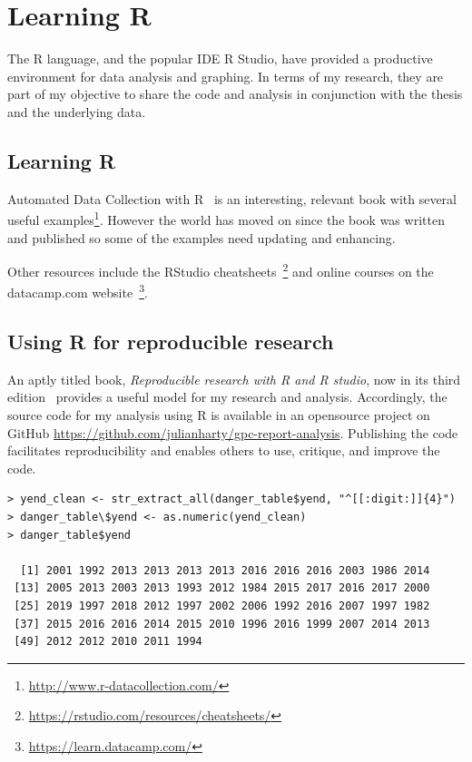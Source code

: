 \chapter{Learning R}
The R language, and the popular IDE R Studio, have provided a productive environment for data analysis and graphing. In terms of my research, they are part of my objective to share the code and analysis in conjunction with the thesis and the underlying data.

\section{Learning R}
Automated Data Collection with R~\cite{munzert2014automated} is an interesting, relevant book with several useful examples\footnote{\url{http://www.r-datacollection.com/}}. However the world has moved on since the book was written and published so some of the examples need updating and enhancing.

Other resources include the RStudio cheatsheets~\footnote{\url{https://rstudio.com/resources/cheatsheets/}} and online courses on the datacamp.com website~\footnote{\url{https://learn.datacamp.com/}}.

\section{Using R for reproducible research}
An aptly titled book, \emph{Reproducible research with R and R studio}, now in its third edition~\cite{gandrud2020reproducible} provides a useful model for my research and analysis. Accordingly, the source code for my analysis using R is available in an opensource project on GitHub \url{https://github.com/julianharty/gpc-report-analysis}. Publishing the code facilitates reproducibility and enables others to use, critique, and improve the code.

\begin{lstlisting}[caption=Parsing dates from Wikipedia content,label=listing:parse_dates]
> yend_clean <- str_extract_all(danger_table$yend, "^[[:digit:]]{4}")
> danger_table\$yend <- as.numeric(yend_clean)
> danger_table$yend

  [1] 2001 1992 2013 2013 2013 2013 2016 2016 2016 2003 1986 2014
 [13] 2005 2013 2003 2013 1993 2012 1984 2015 2017 2016 2017 2000 
 [25] 2019 1997 2018 2012 1997 2002 2006 1992 2016 2007 1997 1982
 [37] 2015 2016 2016 2014 2015 2010 1996 2016 1999 2007 2014 2013
 [49] 2012 2012 2010 2011 1994
\end{lstlisting}

